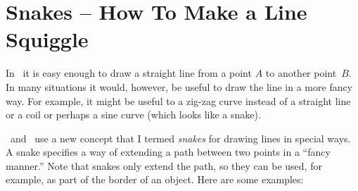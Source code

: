 %


\section{Snakes -- How To Make a Line Squiggle}

In \tikzname\ it is easy enough to draw a straight line from a point
$A$ to another point~$B$. In many situations it would, however, be
useful to draw the line in a more fancy way. For example, it might be
useful to a zig-zag curve instead of a straight line or a coil or
perhaps a sine curve (which looks like a snake).

\tikzname\ and \pgfname\ use a new concept that I termed \emph{snakes}
for drawing lines in special ways. A snake specifies a way of
extending a path between two points in a ``fancy manner.'' Note that
snakes only extend the path, so they can be used, for example, as part
of the border of an object. Here are some examples:

\begin{codeexample}[]
\end{codeexample}

\begin{codeexample}[]
\end{codeexample}

\begin{codeexample}[]
\end{codeexample}

